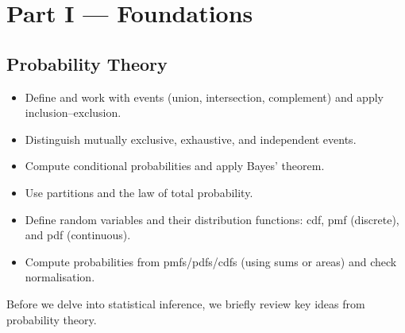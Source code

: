 \documentclass[
  letterpaper,
  DIV=11,
  numbers=noendperiod]{scrreprt}
\providecommand{\tightlist}{%
  \setlength{\itemsep}{0pt}\setlength{\parskip}{0pt}}
\theoremstyle{definition}
\theoremstyle{plain}
\theoremstyle{definition}
\theoremstyle{remark}
\begin{document}
\part{Part I --- Foundations}

\chapter{Probability Theory}\label{probability-theory}

\begin{tcolorbox}[enhanced jigsaw, left=2mm, toprule=.15mm, breakable, opacityback=0, titlerule=0mm, toptitle=1mm, colbacktitle=quarto-callout-note-color!10!white, colframe=quarto-callout-note-color-frame, coltitle=black, rightrule=.15mm, leftrule=.75mm, bottomrule=.15mm, arc=.35mm, bottomtitle=1mm, title=\textcolor{quarto-callout-note-color}{\faInfo}\hspace{0.5em}{Learning objectives}, colback=white, opacitybacktitle=0.6]

\begin{itemize}
\tightlist
\item
  Define and work with events (union, intersection, complement) and
  apply inclusion--exclusion.
\item
  Distinguish mutually exclusive, exhaustive, and independent events.
\item
  Compute conditional probabilities and apply Bayes' theorem.
\item
  Use partitions and the law of total probability.
\item
  Define random variables and their distribution functions: cdf, pmf
  (discrete), and pdf (continuous).
\item
  Compute probabilities from pmfs/pdfs/cdfs (using sums or areas) and
  check normalisation.
\end{itemize}

\end{tcolorbox}

Before we delve into statistical inference, we briefly review key ideas
from probability theory.
\end{document}
